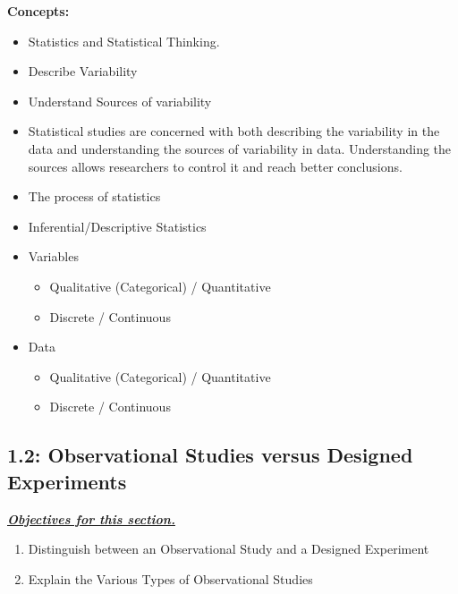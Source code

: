 \documentclass{report}
\begin{document}
        \bigbreak \noindent 
        \textbf{Concepts:}
        \begin{itemize}
            \item Statistics and Statistical Thinking.
            \item Describe Variability
            \item Understand Sources of variability
            \item Statistical studies are concerned with both describing the variability in the data and understanding the sources of variability in data. Understanding the sources allows researchers to control it and reach better conclusions.
            \item The process of statistics
            \item Inferential/Descriptive Statistics
            \item Variables
                \begin{itemize}
                    \item Qualitative (Categorical) / Quantitative
                    \item Discrete / Continuous
                \end{itemize}
            \item Data
                \begin{itemize}
                    \item Qualitative (Categorical) / Quantitative
                    \item Discrete / Continuous
                \end{itemize}
        \end{itemize}

        \pagebreak \bigbreak \noindent
        \subsection{1.2: Observational Studies versus Designed Experiments}
        \bigbreak \noindent 
        \textbf{\textit{\underline{Objectives for this section.}}}
        \begin{enumerate}
            \item Distinguish between an Observational Study and a Designed Experiment
            \item Explain the Various Types of Observational Studies
        \end{enumerate}
\end{document}
